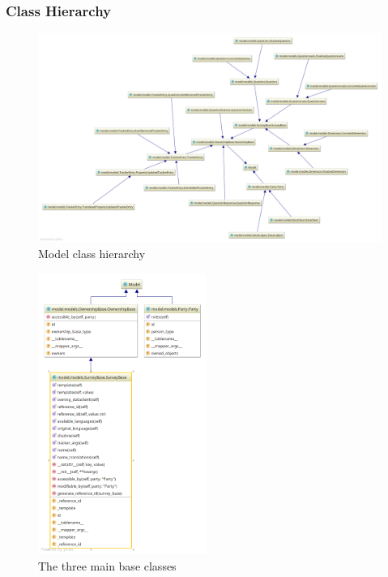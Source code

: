 \documentclass[a4paper,11pt]{article}
\begin{document}
            \subsubsection{Class Hierarchy}
                \begin{figure}
                    \centering
                    \includegraphics[width=\textwidth]{models}
                    \caption{Model class hierarchy}
                    \label{fig:model-dia}
                \end{figure}
                \begin{figure}
                    \centering
                    \includegraphics[width=0.49\textwidth]{base-classes}
                    \caption{The three main base classes}
                    \label{fig:base-classes-dia}
                \end{figure}
\end{document}
